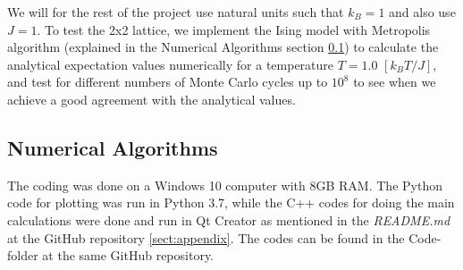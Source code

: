 \documentclass[12pt,a4paper,english]{article}
\begin{document}
We will for the rest of the project use natural units such that $k_B=1$ and also use $J=1$. To test the 2x2 lattice, we implement the Ising model with Metropolis algorithm (explained in the Numerical Algorithms section \ref{subsect:Algo}) to calculate the analytical expectation values numerically for a temperature $T=1.0$ $ [k_BT/J]$, and test for different numbers of Monte Carlo cycles up to $10^8$ to see when we achieve a good agreement with the analytical values.

\subsection{Numerical Algorithms}
\label{subsect:Algo}
The coding was done on a Windows 10 computer with 8GB RAM. The Python code for plotting was run in Python 3.7, while the C++ codes for doing the main calculations were done and run in Qt Creator as mentioned in the \textit{README.md} at the GitHub repository \ref{sect:appendix}. The codes can be found in the Code-folder at the same GitHub repository.
\end{document}
